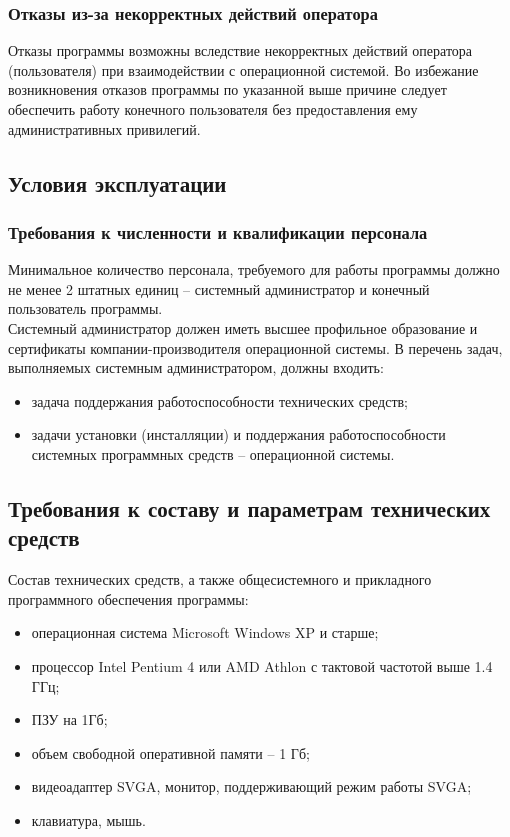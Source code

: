 \documentclass[14pt, a4paper]{extarticle}
\begin{document}
	\subsubsection{Отказы из-за некорректных действий оператора}
	Отказы программы возможны вследствие некорректных действий оператора (пользователя) при взаимодействии с операционной системой. Во избежание возникновения отказов программы по указанной выше причине следует обеспечить работу конечного пользователя без предоставления ему административных привилегий.
	
	\subsection{Условия эксплуатации}
	\subsubsection{Требования к численности и квалификации персонала}
	Минимальное количество персонала, требуемого для работы программы должно не менее 2 штатных единиц – системный администратор и конечный пользователь программы.\\
	Системный администратор должен иметь высшее профильное образование и сертификаты компании-производителя операционной системы. В перечень задач, выполняемых системным администратором, должны входить:
	\begin{itemize}
		\item задача поддержания работоспособности технических средств;
		\item задачи установки (инсталляции) и поддержания работоспособности системных программных средств – операционной системы.
	\end{itemize}

	\subsection{Требования к составу и параметрам технических средств}
	Состав технических средств, а также общесистемного и прикладного программного обеспечения программы:
	\begin{itemize}
		\item операционная система Microsoft Windows XP и старше;
		\item процессор Intel Pentium 4 или AMD Athlon с тактовой частотой выше 1.4 ГГц;
		\item ПЗУ на 1Гб;
		\item объем свободной оперативной памяти – 1 Гб;
		\item видеоадаптер SVGA, монитор, поддерживающий режим работы SVGA;
		\item клавиатура, мышь.
	\end{itemize}
\end{document}
